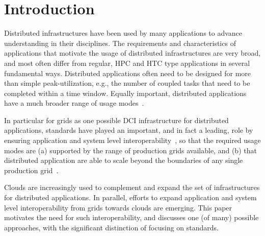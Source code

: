 \documentclass[10pt,conference,final,letterpaper,twoside,twocolumn,]{IEEEtran}
\begin{document}


\section{Introduction}


\label{sec:intro}
 



 Distributed infrastructures have been used by many applications to
 advance understanding in their disciplines.  The requirements and
 characteristics of applications that motivate the usage of
 distributed infrastructures are very broad, and most often differ
 from regular, HPC and HTC type applications in several fundamental
 ways.  Distributed applications often need to be designed for more
 than simple peak-utilization, e.g., the number of coupled tasks that
 need to be completed within a time window.  Equally important,
 distributed applications have a much broader range of usage
 modes~\cite{dpa-paper}.

 In particular for grids as one possible DCI infrastructure for
 distributed applications, standards have played an important, and in
 fact a leading, role by ensuring application and system level
 interoperability~\cite{gin,saga-gin}, so that the required usage
 modes are (a) supported by the range of production grids available,
 and (b) that distributed application are able to scale beyond the
 boundaries of any single production grid~\cite{grid_scale_out}.

 Clouds are increasingly used to complement and expand the set of
 infrastructures for distributed applications.  In parallel, efforts
 to expand application and system level interoperability from grids
 towards clouds are emerging.  This paper motivates the need for such
 interoperability, and discusses one (of many) possible approaches,
 with the significant distinction of focusing on standards.
\end{document}

